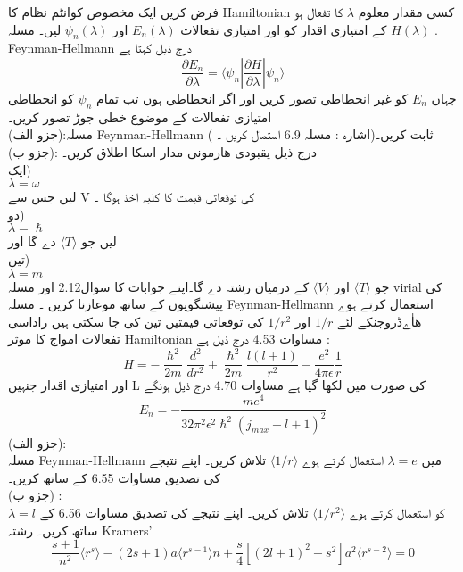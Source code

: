 
فرض کریں ایک مخصوص کوانٹم نظام کا  
Hamiltonian 
کسی مقدار معلوم
\(\lambda\)
 کا تفعال ہو .
\(H(\lambda)\)
کے امتیازی اقدار کو اور امتیازی تفعالات
\(E_{n}(\lambda)\)
اور
\(\psi_{n}(\lambda)\)
لیں۔ 
مسلہ Feynman-Hellmann درج ذیل کہتا ہے
\[\frac{\partial E_{n}}{\partial \lambda}=\big\langle{\psi_{n}|\frac{\partial{H}}{\partial{\lambda}}|\psi_{n}}\big\rangle\]
جہاں 
\(E_{n}\)
کو غیر انحطاطی تصور کریں اور اگر انحطاطی ہوں تب تمام 
\(\psi_{n}\)
کو انحطاطی امتیازی تفعالات کے موضوع خطی جوڑ تصور کریں۔\\
(جزو الف):مسلہ Feynman-Hellmann ثابت کریں۔(اشارہ : مسلہ 6.9 استمال کریں ۔ )\\
(جزو ب): درج ذیل یقبودی هارمونی مدار اسکا اطلاق کریں۔\\
ایک)\\
\(\lambda=\omega\)\\
لیں جس سے
V
کی توقعاتی قیمت کا کلیہ اخذ ہوگا ۔\\
دو)\\
\(\lambda=\hslash\)\\
لیں جو
\(\langle T \rangle\)
دے گا اور\\
تین)\\
\(\lambda=m\)\\
جو 
\(\langle T \rangle\)
اور 
\(\langle V \rangle\)
کے درمیان رشتہ دے گا۔اپنے جوابات کا سوال2.12 اور مسلہ virial کی پیشنگویوں  کے ساتھ موعازنا کریں ۔
مسلہ Feynman-Hellmann استعمال کرتے ہوے ھاٰےڈروجنکے لئے 
\(1/r\)
اور 
\(1/r^{2}\)
کی توقعاتی قیمتیں تین کی جا سکتی ہیں راداسی تفعالات امواج کا موثر 
Hamiltonian 
مساوات 4.53 درج ذیل ہے :
\[H=-\frac{\hslash^{2}}{2m}\frac{d^{2}}{dr^{2}}+\frac{\hslash^{2}}{2m}\frac{l(l+1)}{r^{2}}-\frac{e^{2}}{4\pi\epsilon}\frac{1}{r}\]
اور امتیازی اقدار جنہیں 
L
کی صورت میں لکھا گیا ہے مساوات 4.70 درج ذیل ہونگے 
\[E_n=-\frac{me^{4}}{32\pi^{2}\epsilon^{2}\hslash^{2}(j_{max}+l+1)^{2}}\]
(جزو الف):\\
 مسلہ Feynman-Hellmann میں 
\(\lambda=e\)
استعمال کرتے ہوے
\(\langle1/r\rangle\)
تلاش کریں۔ اپنے نتیجے کی تصدیق مساوات 6.55 کے ساتھ کریں۔\\
(جزو ب) :\\
\(\lambda=l\)
کو استعمال کرتے ہوے
\(\langle1/r^{2}\rangle\)
تلاش کریں۔ اپنے نتیجے کی تصدیق مساوات 6.56 کے ساتھ کریں۔
 رشتہ Kramers' 
\[\frac{s+1}{n^{2}}\langle r^{s}\rangle -(2s+1)a\langle r^{s-1}\rangle n+\frac{s}{4}[(2l+1)^{2}-s^{2}]a^{2}\langle r^{s-2}\rangle =0\]

